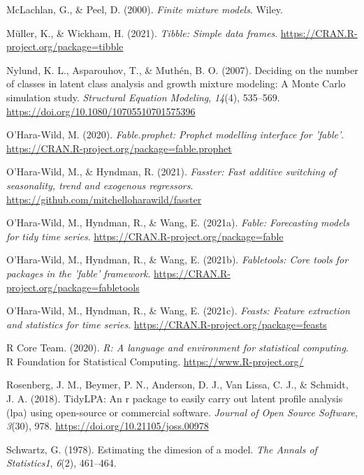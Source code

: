 \documentclass[
  english,
  man,floatsintext]{apa7}
\begin{document}
\leavevmode\hypertarget{ref-McLachlan2000}{}%
McLachlan, G., \& Peel, D. (2000). \emph{Finite mixture models}. Wiley.

\leavevmode\hypertarget{ref-R-tibble}{}%
Müller, K., \& Wickham, H. (2021). \emph{Tibble: Simple data frames}. \url{https://CRAN.R-project.org/package=tibble}

\leavevmode\hypertarget{ref-Nylund2007}{}%
Nylund, K. L., Asparouhov, T., \& Muthén, B. O. (2007). Deciding on the number of classes in latent class analysis and growth mixture modeling: A Monte Carlo simulation study. \emph{Structural Equation Modeling}, \emph{14}(4), 535--569. \url{https://doi.org/10.1080/10705510701575396}

\leavevmode\hypertarget{ref-R-fable.prophet}{}%
O'Hara-Wild, M. (2020). \emph{Fable.prophet: Prophet modelling interface for 'fable'}. \url{https://CRAN.R-project.org/package=fable.prophet}

\leavevmode\hypertarget{ref-R-fasster}{}%
O'Hara-Wild, M., \& Hyndman, R. (2021). \emph{Fasster: Fast additive switching of seasonality, trend and exogenous regressors}. \url{https://github.com/mitchelloharawild/fasster}

\leavevmode\hypertarget{ref-R-fable}{}%
O'Hara-Wild, M., Hyndman, R., \& Wang, E. (2021a). \emph{Fable: Forecasting models for tidy time series}. \url{https://CRAN.R-project.org/package=fable}

\leavevmode\hypertarget{ref-R-fabletools}{}%
O'Hara-Wild, M., Hyndman, R., \& Wang, E. (2021b). \emph{Fabletools: Core tools for packages in the 'fable' framework}. \url{https://CRAN.R-project.org/package=fabletools}

\leavevmode\hypertarget{ref-R-feasts}{}%
O'Hara-Wild, M., Hyndman, R., \& Wang, E. (2021c). \emph{Feasts: Feature extraction and statistics for time series}. \url{https://CRAN.R-project.org/package=feasts}

\leavevmode\hypertarget{ref-R-base}{}%
R Core Team. (2020). \emph{R: A language and environment for statistical computing}. R Foundation for Statistical Computing. \url{https://www.R-project.org/}

\leavevmode\hypertarget{ref-R-tidyLPA}{}%
Rosenberg, J. M., Beymer, P. N., Anderson, D. J., Van Lissa, C. J., \& Schmidt, J. A. (2018). TidyLPA: An r package to easily carry out latent profile analysis (lpa) using open-source or commercial software. \emph{Journal of Open Source Software}, \emph{3}(30), 978. \url{https://doi.org/10.21105/joss.00978}

\leavevmode\hypertarget{ref-Schwartz1978}{}%
Schwartz, G. (1978). Estimating the dimesion of a model. \emph{The Annals of Statistics1}, \emph{6}(2), 461--464.
\end{document}
